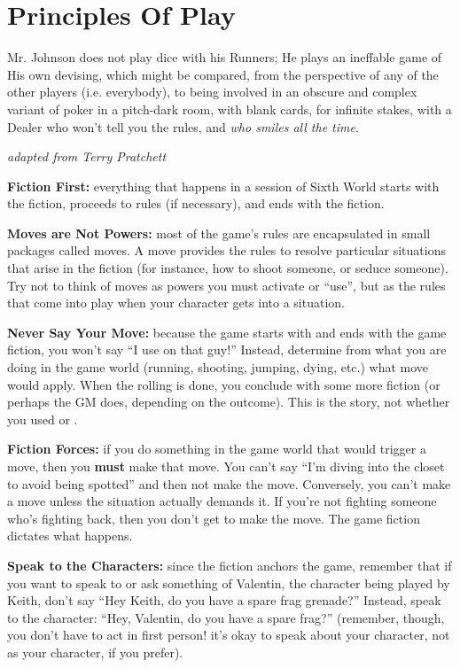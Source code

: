 \chapter{Principles Of Play} \label{principles}

\epigraph{Mr. Johnson does not play dice with his Runners; He plays an ineffable game of His own devising, which might be compared, from the perspective of any of the other players (i.e. everybody), to being involved in an obscure and complex variant of poker in a pitch-dark room, with blank cards, for infinite stakes, with a Dealer who won't tell you the rules, and \textit{who smiles all the time}.}{\textit{adapted from Terry Pratchett}}

\textbf{Fiction First:} everything that happens in a session of Sixth World starts with the fiction, proceeds to rules (if necessary), and ends with the fiction.

\textbf{Moves are Not Powers:} most of the game's rules are encapsulated in small packages called moves. A move provides the rules to resolve particular situations that arise in the fiction (for instance, how to shoot someone, or seduce someone). Try not to think of moves as powers you must activate or ``use'', but as the rules that come into play when your character gets into a situation.

\textbf{Never Say Your Move:} because the game starts with and ends with the game fiction, you won’t say ``I use  on that guy!'' Instead, determine from what you are doing in the game world (running, shooting, jumping, dying, etc.) what move would apply. When the rolling is done, you conclude with some more fiction (or perhaps the GM does, depending on the outcome). This is the story, not whether you used  or .

\textbf{Fiction Forces:} if you do something in the game world that would trigger a move, then you \textbf{must} make that move. You can’t say ``I’m diving into the closet to avoid being spotted'' and then not make the  move. Conversely, you can’t make a move unless the situation actually demands it. If you’re not fighting someone who’s fighting back, then you don’t get to make the  move. The game fiction dictates what happens.

\textbf{Speak to the Characters:} since the fiction anchors the game, remember that if you want to speak to or ask something of Valentin, the character being played by Keith, don’t say ``Hey Keith, do you have a spare frag grenade?'' Instead, speak to the character: ``Hey, Valentin, do you have a spare frag?'' (remember, though, you don’t have to act in first person! it’s okay to speak about your character, not as your character, if you prefer).


